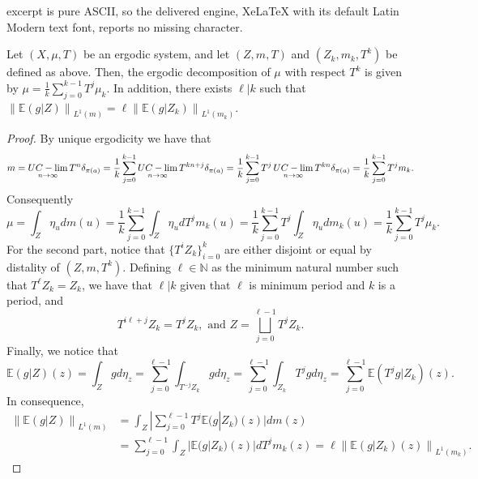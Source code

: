 \documentclass[10pt,a4paper]{amsart}
\newcommand{\E}{\mathbb{E}}
\newcommand{\N}{\mathbb{N}}
\newcommand{\norm}[1]{\left\lVert#1\right\rVert}
\newcommand{\uclim}{\mathop{\textup{\textsf{UC-}}\lim}}
\begin{document}
excerpt is pure ASCII, so the delivered engine, XeLaTeX with its default Latin Modern text font, reports no missing character.
    \begin{prop}\label{ergodic-decom-Tk}
    Let $(X,\mu,T)$ be an ergodic system, and let $(Z,m,T)$ and $(Z_k,m_k,T^k)$ be defined as above. Then, the ergodic decomposition of $\mu$ with respect $T^k$ is given by $\mu= \frac{1}{k}\sum_{j=0}^{k-1}  T^j\mu_k.$ In addition,  there exists $\ell|k$ such that $ \norm{\E(g | Z)}_{L^1(m)}=  \ell  \norm{\E( g | Z_k)}_{L^1(m_k)}.$
    \end{prop}

    \begin{proof}
     By unique ergodicity we have that 
    \begin{equation*}
        m= \uclim_{n\to \infty} T^n\delta_{\pi(a)} = \frac{1}{k}\sum_{j=0}^{k-1}  \uclim_{n\to \infty }T^{kn+j}\delta_{\pi(a)}= \frac{1}{k}\sum_{j=0}^{k-1} T^j  \uclim_{n\to \infty }T^{kn}\delta_{\pi(a)}= \frac{1}{k}\sum_{j=0}^{k-1} T^jm_k.
    \end{equation*}
    Consequently
    \begin{equation*}
        \mu= \int_Z \eta_u dm(u)=  \frac{1}{k}\sum_{j=0}^{k-1}  \int_Z \eta_u dT^jm_k(u)=  \frac{1}{k}\sum_{j=0}^{k-1}  T^j\int_Z \eta_u dm_k(u)=  \frac{1}{k}\sum_{j=0}^{k-1}  T^j\mu_k.
    \end{equation*}
    For the second part, notice that $\{T^iZ_k\}_{i=0}^{k}$ are either disjoint or equal by distality of $(Z,m,T^k)$. Defining $\ell\in \N$ as the minimum natural number such that $T^\ell Z_k=Z_k$, we have that $\ell|k$ given that $\ell$ is minimum period and $k$ is a period, and 
       \begin{equation*}
           T^{i\ell+j}Z_k=T^{j}Z_k, \text{ and } Z=\bigsqcup_{j=0}^{\ell-1}T^jZ_k.
       \end{equation*}
      Finally, we notice that
    \begin{equation*}
       \E(g | Z)(z)= \int_{Z} g d\eta_z= \sum_{j=0}^{\ell-1} \int_{T^{-j}Z_k} g d\eta_z= \sum_{j=0}^{\ell-1} \int_{Z_k} T^jg d\eta_{z} = \sum_{j=0}^{\ell-1} \E( T^jg | Z_k)(z).
    \end{equation*}  
    In consequence,
      \begin{align*}
           \norm{\E(g | Z)}_{L^1(m)} 
           &= \int_{Z} |\sum_{j=0}^{\ell-1} T^j\E( g | Z_k)(z) | dm(z)       
           \\&=  \sum_{j=0}^{\ell-1}\int_{Z} |\E( g | Z_k)(z) | dT^jm_k(z)=  \ell\norm{\E( g | Z_k)(z)}_{L^1(m_k)}.
      \end{align*}
    \end{proof}
\end{document}
